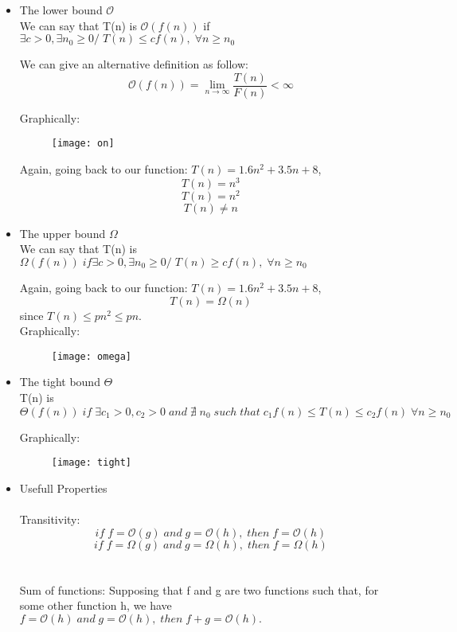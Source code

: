 \begin{itemize}
    \item The lower bound $\mathcal{O}$\\
          We can say that T(n) is $\mathcal{O}{(f(n))}$ if $\exists c > 0, \exists n_{0} \geq 0 / \; T(n) \leq cf(n), \; \forall n \geq n_{0}$

          We can give an alternative definition as follow:
          \[ \mathcal{O}{(f(n))} = \lim_{n\to\infty} \frac{T(n)}{F(n)} < \infty\]

          Graphically:

          \begin{figure}[H]
              \centering
              \texttt{[image: on]}
          \end{figure}

          Again, going back to our function: $T(n) = 1.6n^{2} + 3.5n+8$,
          \[ T(n) = n^{3}\]
          \[ T(n) = n^{2}\]
          \[ T(n) \neq n\]


    \item The upper bound $\Omega$ \\
          We can say that T(n) is $ \Omega(f(n)) \;if \exists c > 0, \exists n_{0} \geq 0 / \; T(n) \geq cf(n), \; \forall n \geq n_{0}$

          Again, going back to our function: $T(n) = 1.6n^{2} + 3.5n+8$,
          \[ T(n) = \Omega(n)\]
          since $T(n) \leq pn^{2} \leq pn$.\\


          Graphically:

          \begin{figure}[H]
              \centering
              \texttt{[image: omega]}
          \end{figure}

    \item The tight bound $\Theta$ \\
          T(n) is $ \Theta(f(n)) \; if \; \exists c_{1} > 0, c_{2}>0 \; and \; \nexists \;n_{0} \; such \; that \; c_{1}f(n) \leq T(n) \leq c_{2} f(n) \; \forall n \geq n_{0}$

          Graphically:

          \begin{figure}[H]
              \centering
              \texttt{[image: tight]}
          \end{figure}

    \item {Usefull Properties}\\\\
          Transitivity:
          \[ if \; f = \mathcal{O}{(g)} \; and \; g =\mathcal{O}{(h)}, \; then \;f = \mathcal{O}{(h)}\]
          \[ if \; f = \Omega{(g)} \; and \; g =\Omega{(h)}, \; then \;f = \Omega{(h)}\]\\\\
          Sum of functions:
          Supposing that f and g are two functions such that, for some other function h, we have $f = \mathcal{O}{(h)} \; and \;g = \mathcal{O}{(h)}, \; then \; f + g = \mathcal{O}{(h)}.$

\end{itemize}

